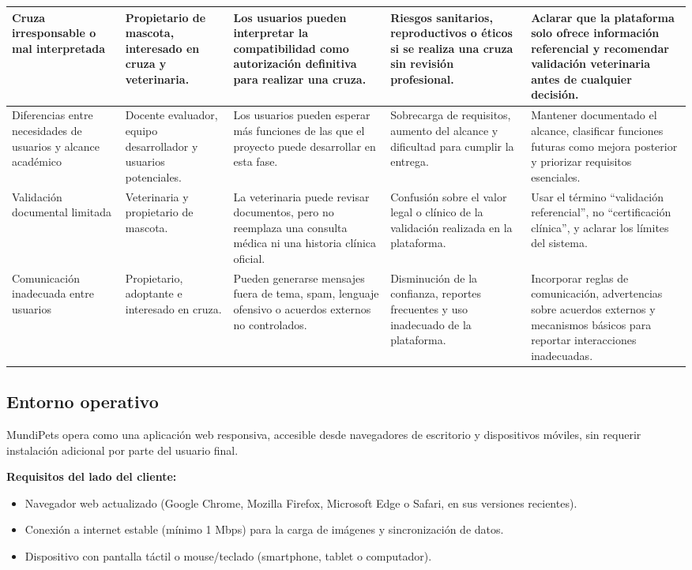 \documentclass[journal,onecolumn]{IEEEtran}
\begin{document}
\begin{longtable}{|p{2.2cm}|p{2.2cm}|p{2.8cm}|p{3.2cm}|p{3.3cm}|}
		Cruza irresponsable o mal interpretada & Propietario de mascota, interesado en cruza y veterinaria. & Los usuarios pueden interpretar la compatibilidad como autorización definitiva para realizar una cruza. & Riesgos sanitarios, reproductivos o éticos si se realiza una cruza sin revisión profesional. & Aclarar que la plataforma solo ofrece información referencial y recomendar validación veterinaria antes de cualquier decisión. \\ \hline
		
		Diferencias entre necesidades de usuarios y alcance académico & Docente evaluador, equipo desarrollador y usuarios potenciales. & Los usuarios pueden esperar más funciones de las que el proyecto puede desarrollar en esta fase. & Sobrecarga de requisitos, aumento del alcance y dificultad para cumplir la entrega. & Mantener documentado el alcance, clasificar funciones futuras como mejora posterior y priorizar requisitos esenciales. \\ \hline
		
		Validación documental limitada & Veterinaria y propietario de mascota. & La veterinaria puede revisar documentos, pero no reemplaza una consulta médica ni una historia clínica oficial. & Confusión sobre el valor legal o clínico de la validación realizada en la plataforma. & Usar el término ``validación referencial'', no ``certificación clínica'', y aclarar los límites del sistema. \\ \hline
		
		Comunicación inadecuada entre usuarios & Propietario, adoptante e interesado en cruza. & Pueden generarse mensajes fuera de tema, spam, lenguaje ofensivo o acuerdos externos no controlados. & Disminución de la confianza, reportes frecuentes y uso inadecuado de la plataforma. & Incorporar reglas de comunicación, advertencias sobre acuerdos externos y mecanismos básicos para reportar interacciones inadecuadas. \\ \hline
	\end{longtable}
	
	\subsection{Entorno operativo}
	\label{sec:entorno}
	
	MundiPets opera como una aplicación web responsiva, accesible desde
	navegadores de escritorio y dispositivos móviles, sin requerir instalación
	adicional por parte del usuario final.
	
	\textbf{Requisitos del lado del cliente:}
	\begin{itemize}[leftmargin=*]
		\item Navegador web actualizado (Google Chrome, Mozilla Firefox, Microsoft Edge o Safari, en sus versiones recientes).
		\item Conexión a internet estable (mínimo 1 Mbps) para la carga de imágenes y sincronización de datos.
		\item Dispositivo con pantalla táctil o mouse/teclado (smartphone, tablet o computador).
	\end{itemize}
	
\end{document}
